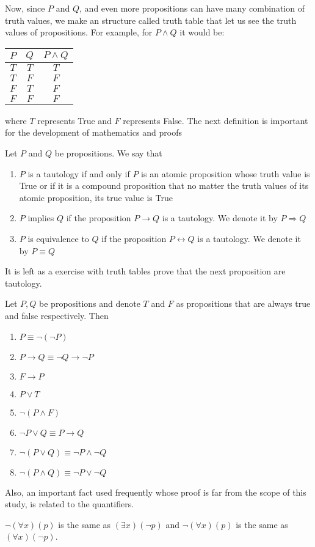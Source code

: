 \documentclass{tufte-handout}
\begin{document}
Now, since $P$ and $Q$, and even more propositions can have many combination of truth values, we make an structure called truth table that let us see the truth values of propositions. For example, for $P \wedge Q$ it would be:
\begin{center}
	\begin{tabular}{|c |c |c|}
		\hline
		$P$ & $Q$ & $P \wedge Q$\\
		\hline
		$T$ & $T$ & $T$\\
		\hline
		$T$ & $F$ & $F$\\
		\hline
		$F$ & $T$ & $F$\\
		\hline
		$F$ & $F$& $F$\\
		\hline
	\end{tabular}
\end{center}
where $T$ represents True and $F$ represents False. The next definition is important for the development of mathematics and proofs
\begin{definition}
	Let $P$ and $Q$ be propositions. We say that
	\begin{enumerate}
		\item $P$ is a tautology if and only if $P$ is an atomic proposition whose truth value is True or if it is a compound proposition that no matter the truth values of its atomic proposition, its true value is True
		\item $P$ implies $Q$ if the proposition $P \rightarrow Q$ is a tautology. We denote it by $P \Rightarrow Q$
		\item $P$ is equivalence to $Q$ if the proposition $P \leftrightarrow Q$ is a tautology. We denote it by $P \equiv Q$
	\end{enumerate}
\end{definition}

It is left as a exercise with truth tables prove that the next proposition are tautology.
\begin{theorem}
	Let $P, Q$ be propositions and denote $T$ and $F$ as propositions that are always true and false respectively. Then
	\begin{enumerate}
		\item $P \equiv \neg(\neg P)$
		\item $P \rightarrow Q \equiv \neg Q \rightarrow \neg P$
		\item $F \rightarrow P$
		\item $P \vee T$
		\item $\neg(P \wedge F)$
		\item $\neg P \vee Q \equiv P \rightarrow Q$
		\item $\neg(P \vee Q) \equiv \neg P \wedge \neg Q$
		\item $\neg(P \wedge Q) \equiv \neg P \vee \neg Q$
	\end{enumerate}
\end{theorem}

Also, an important fact used frequently whose proof is far from the scope of this study, is related to the quantifiers.

\begin{proposition}
	$\neg(\forall x)(p)$ is the same as $(\exists x)(\neg p)$ and $\neg(\forall x)(p)$ is the same as $(\forall x)(\neg p)$.
\end{proposition}
\end{document}
